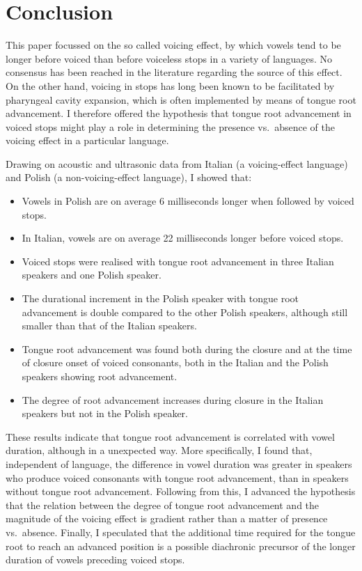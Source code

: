 \documentclass[authoryear, twocolumn]{elsarticle}
\providecommand{\tightlist}{%
  \setlength{\itemsep}{0pt}\setlength{\parskip}{0pt}}
\begin{document}
\section{Conclusion}\label{conclusion}

\label{s:conclusion}

This paper focussed on the so called voicing effect, by which vowels
tend to be longer before voiced than before voiceless stops in a variety
of languages. No consensus has been reached in the literature regarding
the source of this effect. On the other hand, voicing in stops has long
been known to be facilitated by pharyngeal cavity expansion, which is
often implemented by means of tongue root advancement. I therefore
offered the hypothesis that tongue root advancement in voiced stops
might play a role in determining the presence vs.~absence of the voicing
effect in a particular language.

Drawing on acoustic and ultrasonic data from Italian (a voicing-effect
language) and Polish (a non-voicing-effect language), I showed that:

\begin{itemize}
\tightlist
\item
  Vowels in Polish are on average 6 milliseconds longer when followed by
  voiced stops.
\item
  In Italian, vowels are on average 22 milliseconds longer before voiced
  stops.
\item
  Voiced stops were realised with tongue root advancement in three
  Italian speakers and one Polish speaker.
\item
  The durational increment in the Polish speaker with tongue root
  advancement is double compared to the other Polish speakers, although
  still smaller than that of the Italian speakers.
\item
  Tongue root advancement was found both during the closure and at the
  time of closure onset of voiced consonants, both in the Italian and
  the Polish speakers showing root advancement.
\item
  The degree of root advancement increases during closure in the Italian
  speakers but not in the Polish speaker.
\end{itemize}

These results indicate that tongue root advancement is correlated with
vowel duration, although in a unexpected way. More specifically, I found
that, independent of language, the difference in vowel duration was
greater in speakers who produce voiced consonants with tongue root
advancement, than in speakers without tongue root advancement. Following
from this, I advanced the hypothesis that the relation between the
degree of tongue root advancement and the magnitude of the voicing
effect is gradient rather than a matter of presence vs.~absence.
Finally, I speculated that the additional time required for the tongue
root to reach an advanced position is a possible diachronic precursor of
the longer duration of vowels preceding voiced stops.


\end{document}
